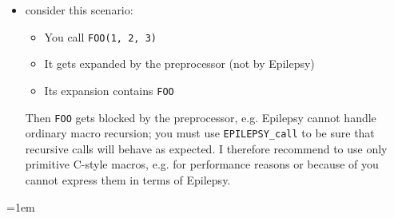\documentclass[12pt]{article}
\theoremstyle{break}
\begin{document}
\begin{itemize}
\item consider this scenario:
    \begin{itemize}
        \item You call \texttt{FOO(1, 2, 3)}
        \item It gets expanded by the preprocessor (not by Epilepsy)
        \item Its expansion contains \texttt{FOO}
    \end{itemize}
Then \texttt{FOO} gets blocked \cite{Blueprinting} by the preprocessor, e.g. Epilepsy cannot handle ordinary
macro recursion; you must use \texttt{EPILEPSY\_call} to be sure that recursive calls
will behave as expected. I therefore recommend to use only primitive C-style macros, e.g.
for performance reasons or because of you cannot express them in terms of Epilepsy.
\end{itemize}

\emergencystretch=1em
\printbibliography
\end{document}
